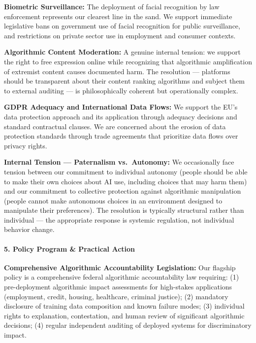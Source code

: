 \textbf{Biometric Surveillance:} The deployment of facial recognition by
law enforcement represents our clearest line in the sand. We support
immediate legislative bans on government use of facial recognition for
public surveillance, and restrictions on private sector use in
employment and consumer contexts.

\textbf{Algorithmic Content Moderation:} A genuine internal tension: we
support the right to free expression online while recognizing that
algorithmic amplification of extremist content causes documented harm.
The resolution --- platforms should be transparent about their content
ranking algorithms and subject them to external auditing --- is
philosophically coherent but operationally complex.

\textbf{GDPR Adequacy and International Data Flows:} We support the EU's
data protection approach and its application through adequacy decisions
and standard contractual clauses. We are concerned about the erosion of
data protection standards through trade agreements that prioritize data
flows over privacy rights.

\textbf{Internal Tension --- Paternalism vs.~Autonomy:} We occasionally
face tension between our commitment to individual autonomy (people
should be able to make their own choices about AI use, including choices
that may harm them) and our commitment to collective protection against
algorithmic manipulation (people cannot make autonomous choices in an
environment designed to manipulate their preferences). The resolution is
typically structural rather than individual --- the appropriate response
is systemic regulation, not individual behavior change.

\paragraph{5. Policy Program \& Practical
Action}\label{policy-program-practical-action-34}

\textbf{Comprehensive Algorithmic Accountability Legislation:} Our
flagship policy is a comprehensive federal algorithmic accountability
law requiring: (1) pre-deployment algorithmic impact assessments for
high-stakes applications (employment, credit, housing, healthcare,
criminal justice); (2) mandatory disclosure of training data composition
and known failure modes; (3) individual rights to explanation,
contestation, and human review of significant algorithmic decisions; (4)
regular independent auditing of deployed systems for discriminatory
impact.

